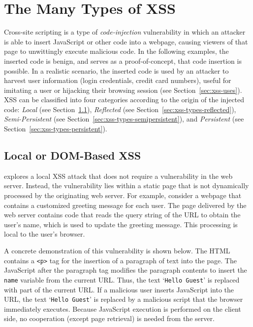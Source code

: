 \documentclass{acmtrans2m}
\begin{document}

\section{The Many Types of XSS}\label{sec:xss-types}\label{sec:code-injection}
Cross-site scripting is a type of \emph{code-injection} vulnerability in which an attacker is able to insert JavaScript or other code into a webpage, causing viewers of that page to unwittingly execute malicious code.
In the following examples, the inserted code is benign, and serves as a proof-of-concept, that code insertion is possible.
In a realistic scenario, the inserted code is used by an attacker to harvest user information (login credentials, credit card numbers), useful for imitating a user or hijacking their browsing session (see Section~\ref{sec:xss-uses}).
XSS can be classified into four categories according to the origin of the injected code: \emph{Local} (see Section~\ref{sec:xss-types-local}), \emph{Reflected} (see Section~\ref{sec:xss-types-reflected}), \emph{Semi-Persistent} (see Section~\ref{sec:xss-types-semipersistent}), and \emph{Persistent} (see Section~\ref{sec:xss-types-persistent}).

\subsection{Local or DOM-Based XSS}\label{sec:xss-types-local}
 explores a local XSS attack that does not require a vulnerability in the web server.
Instead, the vulnerability lies within a static page that is not dynamically processed by the originating web server.
For example, consider a webpage that contains a customized greeting message for each user.
The page delivered by the web server contains code that reads the query string of the URL to obtain the user's name, which is used to update the greeting message.
This processing is local to the user's browser.

A concrete demonstration of this vulnerability is shown below.
The HTML contains a \texttt{<p>} tag for the insertion of a paragraph of text into the page.
The JavaScript after the paragraph tag modifies the paragraph contents to insert the \texttt{name} variable from the current URL.
Thus, the text `\texttt{Hello Guest}' is replaced with part of the current URL.
If a malicious user inserts JavaScript into the URL, the text `\texttt{Hello Guest}' is replaced by a malicious script that the browser immediately executes.
Because JavaScript execution is performed on the client side, no cooperation (except page retrieval) is needed from the server.
\end{document}
